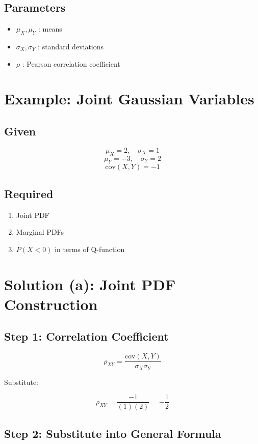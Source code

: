 \documentclass[11pt]{article}
\begin{document}
\subsection{Parameters}

\begin{itemize}[noitemsep]
\item $\mu_X, \mu_Y$ : means
\item $\sigma_X, \sigma_Y$ : standard deviations
\item $\rho$ : Pearson correlation coefficient
\end{itemize}

\section{Example: Joint Gaussian Variables}

\subsection*{Given}

\[
\mu_X = 2, \quad \sigma_X = 1
\]
\[
\mu_Y = -3, \quad \sigma_Y = 2
\]
\[
\text{cov}(X,Y) = -1
\]

\subsection*{Required}

\begin{enumerate}[label=\alph*.]
\item Joint PDF
\item Marginal PDFs
\item $P(X < 0)$ in terms of Q-function
\end{enumerate}

\section{Solution (a): Joint PDF Construction}

\subsection*{Step 1: Correlation Coefficient}

\[
\rho_{XY} = \frac{\text{cov}(X,Y)}{\sigma_X \sigma_Y}
\]

Substitute:

\[
\rho_{XY} = \frac{-1}{(1)(2)} = -\frac{1}{2}
\]

\subsection*{Step 2: Substitute into General Formula}
\end{document}
